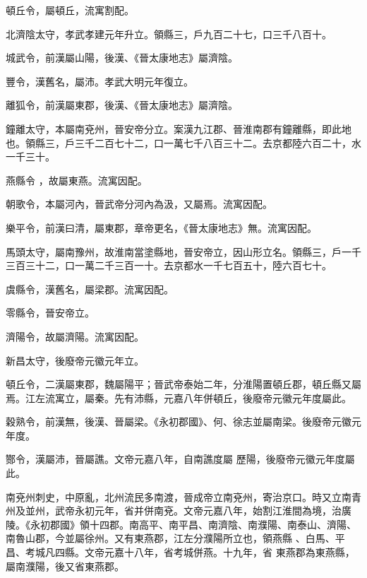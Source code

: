 \begin{pinyinscope}
 頓丘令，屬頓丘，流寓割配。



 北濟陰太守，孝武孝建元年升立。領縣三，戶九百二十七，口三千八百十。



 城武令，前漢屬山陽，後漢、《晉太康地志》屬濟陰。



 豐令，漢舊名，屬沛。孝武大明元年復立。



 離狐令，前漢屬東郡，後漢、《晉太康地志》屬濟陰。



 鐘離太守，本屬南兗州，晉安帝分立。案漢九江郡、晉淮南郡有鐘離縣，即此地也。領縣三，戶三千二百七十二，口一萬七千八百三十二。去京都陸六百二十，水一千三十。


燕縣令
 ，故屬東燕。流寓因配。



 朝歌令，本屬河內，晉武帝分河內為汲，又屬焉。流寓因配。



 樂平令，前漢曰清，屬東郡，章帝更名，《晉太康地志》無。流寓因配。



 馬頭太守，屬南豫州，故淮南當塗縣地，晉安帝立，因山形立名。領縣三，戶一千三百三十二，口一萬二千三百一十。去京都水一千七百五十，陸六百七十。



 虞縣令，漢舊名，屬梁郡。流寓因配。



 零縣令，晉安帝立。



 濟陽令，故屬濟陽。流寓因配。



 新昌太守，後廢帝元徽元年立。



 頓丘令，二漢屬東郡，魏屬陽平；晉武帝泰始二年，分淮陽置頓丘郡，頓丘縣又屬焉。江左流寓立，屬秦。先有沛縣，元嘉八年併頓丘，後廢帝元徽元年度屬此。



 穀熟令，前漢無，後漢、晉屬梁。《永初郡國》、何、徐志並屬南梁。後廢帝元徽元年度。



 酂令，漢屬沛，晉屬譙。文帝元嘉八年，自南譙度屬
 歷陽，後廢帝元徽元年度屬此。


南兗州刺史，中原亂，北州流民多南渡，晉成帝立南兗州，寄治京口。時又立南青州及並州，武帝永初元年，省并併南兗。文帝元嘉八年，始割江淮間為境，治廣陵。《永初郡國》領十四郡。南高平、南平昌、南濟陰、南濮陽、南泰山、濟陽、南魯山郡，今並屬徐州。又有東燕郡，江左分濮陽所立也，領燕縣
 、白馬、平昌、考城凡四縣。文帝元嘉十八年，省考城併燕。十九年，省
 東燕郡為東燕縣，屬南濮陽，後又省東燕郡。



\end{pinyinscope}
